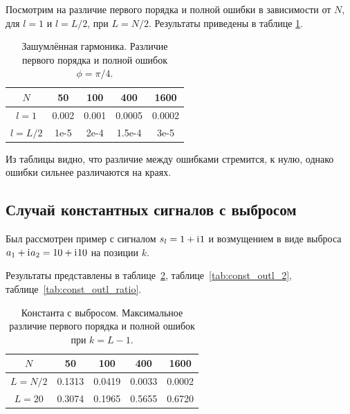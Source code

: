 \documentclass[specialist,
               substylefile = spbu.rtx,
               subf,href,colorlinks=true, 12pt]{disser}
\begin{document}
Посмотрим на различие первого порядка и полной ошибки в зависимости от $N$, для $l = 1$ и $l = L / 2$, при $L = N / 2$. Результаты приведены в таблице \ref{tab:harm_conv_comp}.

\begin{table}[H]
	\begin{center}
		\caption{Зашумлённая гармоника. Различие первого порядка и полной ошибок $\phi = \pi/4$.}
		\label{tab:harm_conv_comp}
		\begin{tabular}{|c|c|c|c|c|}
			\hline
			$N$	& 50 & 100 & 400 & 1600 \\
			\hline
			$l = 1$ & 0.002  & 0.001  & 0.0005 & 0.0002 \\
			\hline
			$l = L / 2$ & 1e-5  & 2e-4  & 1.5e-4 & 3e-5 \\
			\hline
		\end{tabular}
	\end{center}
\end{table}

Из таблицы видно, что различие между ошибками стремится, к нулю, однако ошибки сильнее различаются на краях.

\subsection{Случай константных сигналов с выбросом}

Был рассмотрен пример с сигналом $s_l = 1 + \mathrm{i}\mkern1mu 1$ и возмущением в виде выброса $a_1 + \mathrm{i}\mkern1mu a_2 = 10 + \mathrm{i}\mkern1mu 10$ на позиции $k$.

Результаты представлены в таблице~\ref{tab:const_outl_1}, таблице~\ref{tab:const_outl_2}, таблице~\ref{tab:const_outl_ratio}.

\begin{table}[H]
	\begin{center}
		\caption{Константа с выбросом. Максимальное различие первого порядка и полной ошибок при $k = L - 1$.}
		\label{tab:const_outl_1}
		\begin{tabular}{|c|c|c|c|c|}
			\hline
			$N$	& 50 & 100 & 400 & 1600 \\
			\hline
			$L = N / 2$ & 0.1313  & 0.0419  & 0.0033 & 0.0002 \\
			\hline
			$L = 20$ & 0.3074  & 0.1965  & 0.5655 & 0.6720 \\
			\hline
		\end{tabular}
	\end{center}
\end{table}
\end{document}

